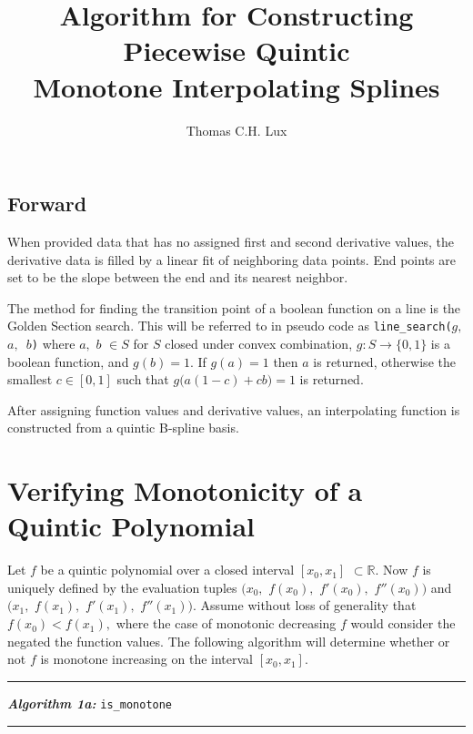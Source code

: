 \documentclass{article}
\begin{document}
\title{Algorithm for Constructing Piecewise Quintic \\ Monotone Interpolating Splines}
\author{Thomas C.H. Lux}
\maketitle

\subsection*{Forward}

When provided data that has no assigned first and second derivative values, the derivative data is filled by a linear fit of neighboring data points. End points are set to be the slope between the end and its nearest neighbor.

The method for finding the transition point of a boolean function on a line is the Golden Section search. This will be referred to in pseudo code as \texttt{line\_search($g,$ $a,$ $b$)} where $a,$ $b$ $\in S$ for $S$ closed under convex combination, $g: S \rightarrow \{0,1\}$ is a boolean function, and $g(b) = 1$. If $g(a) = 1$ then $a$ is returned, otherwise the smallest $c \in [0,1]$ such that $g\big(a(1-c) + c b\big) = 1$ is returned.

After assigning function values and derivative values, an interpolating function is constructed from a quintic B-spline basis.

\vspace{10pt}


\section{Verifying Monotonicity of a Quintic Polynomial}
\label{is_monotone}
Let $f$ be a quintic polynomial over a closed interval $[x_0, x_1]$ $\subset \mathbb{R}$. Now $f$ is uniquely defined by the evaluation tuples $\big(x_0,$ $f(x_0),$ $f'(x_0),$ $f''(x_0)\big)$ and $\big(x_1,$ $f(x_1),$ $f'(x_1),$ $f''(x_1)\big).$ Assume without loss of generality that $f(x_0) < f(x_1),$ where the case of monotonic decreasing $f$ would consider the negated the function values. The following algorithm will determine whether or not $f$ is monotone increasing on the interval $[x_0, x_1].$

\vspace{10pt}
\hrule
\vspace{3pt}
\noindent\textbf{\textit{Algorithm 1a:}} \texttt{is\_monotone}
\vspace{3pt}
\hrule
\end{document}
